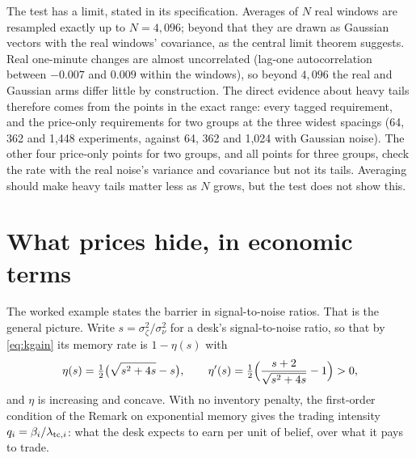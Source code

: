 \documentclass[12pt]{article}
\theoremstyle{definition}
\theoremstyle{remark}
\begin{document}
The test has a limit, stated in its specification. Averages of $N$ real windows are resampled exactly up to $N=4{,}096$; beyond that they are drawn as Gaussian vectors with the real windows' covariance, as the central limit theorem suggests. Real one-minute changes are almost uncorrelated (lag-one autocorrelation between $-0.007$ and $0.009$ within the windows), so beyond $4{,}096$ the real and Gaussian arms differ little by construction. The direct evidence about heavy tails therefore comes from the points in the exact range: every tagged requirement, and the price-only requirements for two groups at the three widest spacings (64, 362 and 1{,}448 experiments, against 64, 362 and 1{,}024 with Gaussian noise). The other four price-only points for two groups, and all points for three groups, check the rate with the real noise's variance and covariance but not its tails. Averaging should make heavy tails matter less as $N$ grows, but the test does not show this.

\section{What prices hide, in economic terms}\label{sec:primitives}

The worked example states the barrier in signal-to-noise ratios. That is the general picture. Write $s=\sigma_\zeta^2/\sigma_\nu^2$ for a desk's signal-to-noise ratio, so that by \eqref{eq:kgain} its memory rate is $1-\eta(s)$ with
\[
\eta(s)=\tfrac12\bigl(\sqrt{s^2+4s}-s\bigr),\qquad \eta'(s)=\tfrac12\Bigl(\frac{s+2}{\sqrt{s^2+4s}}-1\Bigr)>0 ,
\]
and $\eta$ is increasing and concave. With no inventory penalty, the first-order condition of the Remark on exponential memory gives the trading intensity $q_i=\beta_i/\lambda_{{\rm tc},i}$: what the desk expects to earn per unit of belief, over what it pays to trade.
\end{document}

